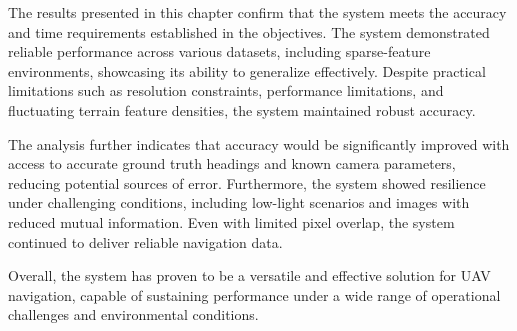 The results presented in this chapter confirm that the system meets the accuracy and time requirements established in the objectives. The system demonstrated reliable performance across various datasets, including sparse-feature environments, showcasing its ability to generalize effectively. Despite practical limitations such as resolution constraints, performance limitations, and fluctuating terrain feature densities, the system maintained robust accuracy.

The analysis further indicates that accuracy would be significantly improved with access to accurate ground truth headings and known camera parameters, reducing potential sources of error. Furthermore, the system showed resilience under challenging conditions, including low-light scenarios and images with reduced mutual information. Even with limited pixel overlap, the system continued to deliver reliable navigation data.

Overall, the system has proven to be a versatile and effective solution for UAV navigation, capable of sustaining performance under a wide range of operational challenges and environmental conditions.

